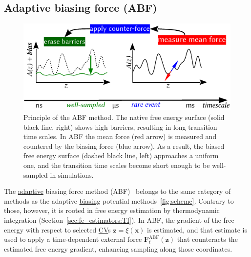 \documentclass[9pt,review]{livecoms}
\newcommand{\vx}{\mathbf{x}}
\newcommand{\vz}{\mathbf{z}}
\newcommand{\vF}{\mathbf{F}}
\begin{document}
\subsection{Adaptive biasing force (ABF)}
\label{sec:ABF}

\begin{figure}
    \centering
    \includegraphics{Figures/abf_new.pdf}
    \caption{Principle of the ABF method. The native free energy surface (solid black line, right) shows high barriers, resulting in long transition time scales.
    In ABF the mean force (red arrow) is measured and countered by the biasing force (blue arrow). As a result, the biased free energy surface (dashed black line, left) approaches a uniform one, and the transition time scales become short enough to be well-sampled in simulations.}
    \label{fig:ABF}
\end{figure}

The \hyperlink{ref:Adaptive} {adaptive} biasing force method (ABF)~\cite{Darve2001, Comer2015} belongs to the same category of methods as the adaptive \hyperlink{ref:biasingE} {biasing} potential methods~\ref{fig:scheme}. Contrary to those, however, it is rooted in free energy estimation by thermodynamic integration (Section~\ref{sec:fe_estimators:TI}).
In ABF, the gradient of the free energy with respect to selected \hyperlink{ref:CV} {CV}s $\vz = \xi(\vx)$ is estimated, and that estimate is used to apply a time-dependent external force $\vF^\mathrm{ABF}_t(\vz)$ that counteracts the estimated free energy gradient, enhancing sampling along those coordinates.
\end{document}
